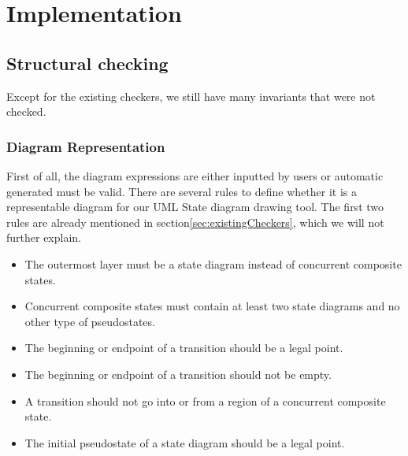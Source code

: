 \chapter{Implementation}
\label{chap:implementation}

\section{Structural checking}
\label{sec:properties}

Except for the existing checkers, we still have many invariants that were not checked.

\subsection{Diagram Representation}
\label{sec:representation}


First of all, the diagram expressions are either inputted by users or automatic generated must be valid.
There are several rules to define whether it is a representable diagram for our UML State diagram drawing tool.
The first two rules are already mentioned in section\ref{sec:existingCheckers}, which we will not further explain.


\begin{itemize}
\item  The outermost layer must be a state diagram instead of concurrent composite states.
\end{itemize}


\begin{itemize}
\item Concurrent composite states must contain at least two state diagrams and no other type of pseudostates.
\end{itemize}

\begin{itemize}
\item The beginning or endpoint of a transition should be a legal point. 
\end{itemize}

\begin{itemize}
\item The beginning or endpoint of a transition should not be empty.
\end{itemize}
\begin{itemize}
\item A transition should not go into or from a region of a concurrent composite state.

\end{itemize}
\begin{itemize}
\item The initial pseudostate of a state diagram should be a legal point.
\end{itemize}

